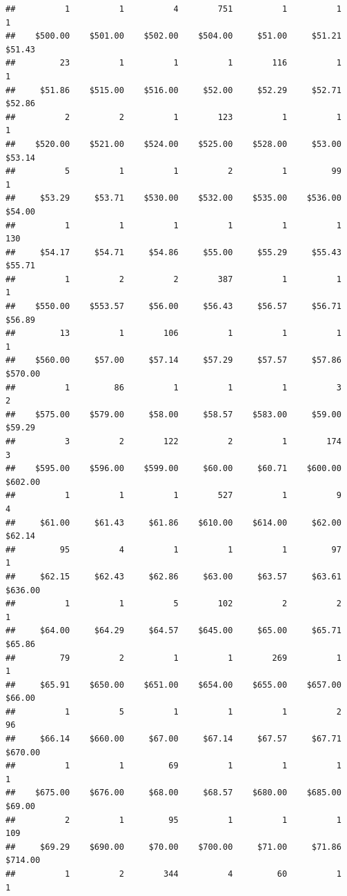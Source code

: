 \begin{verbatim}
##          1          1          4        751          1          1          1 
##    $500.00    $501.00    $502.00    $504.00     $51.00     $51.21     $51.43 
##         23          1          1          1        116          1          1 
##     $51.86    $515.00    $516.00     $52.00     $52.29     $52.71     $52.86 
##          2          2          1        123          1          1          1 
##    $520.00    $521.00    $524.00    $525.00    $528.00     $53.00     $53.14 
##          5          1          1          2          1         99          1 
##     $53.29     $53.71    $530.00    $532.00    $535.00    $536.00     $54.00 
##          1          1          1          1          1          1        130 
##     $54.17     $54.71     $54.86     $55.00     $55.29     $55.43     $55.71 
##          1          2          2        387          1          1          1 
##    $550.00    $553.57     $56.00     $56.43     $56.57     $56.71     $56.89 
##         13          1        106          1          1          1          1 
##    $560.00     $57.00     $57.14     $57.29     $57.57     $57.86    $570.00 
##          1         86          1          1          1          3          2 
##    $575.00    $579.00     $58.00     $58.57    $583.00     $59.00     $59.29 
##          3          2        122          2          1        174          3 
##    $595.00    $596.00    $599.00     $60.00     $60.71    $600.00    $602.00 
##          1          1          1        527          1          9          4 
##     $61.00     $61.43     $61.86    $610.00    $614.00     $62.00     $62.14 
##         95          4          1          1          1         97          1 
##     $62.15     $62.43     $62.86     $63.00     $63.57     $63.61    $636.00 
##          1          1          5        102          2          2          1 
##     $64.00     $64.29     $64.57    $645.00     $65.00     $65.71     $65.86 
##         79          2          1          1        269          1          1 
##     $65.91    $650.00    $651.00    $654.00    $655.00    $657.00     $66.00 
##          1          5          1          1          1          2         96 
##     $66.14    $660.00     $67.00     $67.14     $67.57     $67.71    $670.00 
##          1          1         69          1          1          1          1 
##    $675.00    $676.00     $68.00     $68.57    $680.00    $685.00     $69.00 
##          2          1         95          1          1          1        109 
##     $69.29    $690.00     $70.00    $700.00     $71.00     $71.86    $714.00 
##          1          2        344          4         60          1          1 

\end{verbatim}
